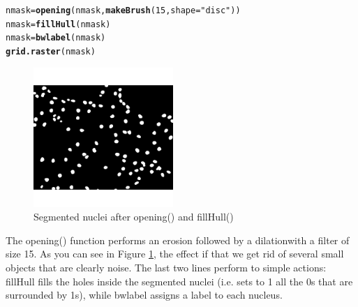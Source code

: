 \documentclass{article}\usepackage[]{graphicx}\usepackage[]{color}
\makeatletter
\newcommand{\hlnum}[1]{\textcolor[rgb]{0.686,0.059,0.569}{#1}}%
\newcommand{\hlstr}[1]{\textcolor[rgb]{0.192,0.494,0.8}{#1}}%
\newcommand{\hlstd}[1]{\textcolor[rgb]{0.345,0.345,0.345}{#1}}%
\newcommand{\hlkwb}[1]{\textcolor[rgb]{0.69,0.353,0.396}{#1}}%
\newcommand{\hlkwc}[1]{\textcolor[rgb]{0.333,0.667,0.333}{#1}}%
\newcommand{\hlkwd}[1]{\textcolor[rgb]{0.737,0.353,0.396}{\textbf{#1}}}%
\newenvironment{kframe}{%
 \def\at@end@of@kframe{}%
 \ifinner\ifhmode%
  \def\at@end@of@kframe{\end{minipage}}%
  \begin{minipage}{\columnwidth}%
 \fi\fi%
 \def\FrameCommand##1{\hskip\@totalleftmargin \hskip-\fboxsep
 \colorbox{shadecolor}{##1}\hskip-\fboxsep
     \hskip-\linewidth \hskip-\@totalleftmargin \hskip\columnwidth}%
 \MakeFramed {\advance\hsize-\width
   \@totalleftmargin\z@ \linewidth\hsize
   \@setminipage}}%
 {\par\unskip\endMakeFramed%
 \at@end@of@kframe}
\newenvironment{knitrout}{}{} %
\makeatother
\begin{document}
\begin{knitrout}
\color{fgcolor}\begin{kframe}
\begin{alltt}
\hlstd{nmask} \hlkwb{=} \hlkwd{opening}\hlstd{(nmask,} \hlkwd{makeBrush}\hlstd{(}\hlnum{15}\hlstd{,} \hlkwc{shape}\hlstd{=}\hlstr{"disc"}\hlstd{))}
\hlstd{nmask} \hlkwb{=} \hlkwd{fillHull}\hlstd{(nmask)}
\hlstd{nmask} \hlkwb{=} \hlkwd{bwlabel}\hlstd{(nmask)}
\hlkwd{grid.raster}\hlstd{(nmask)}
\end{alltt}
\end{kframe}\begin{figure}

{\centering \includegraphics[width=200px]{knit_figure/figopening-1} 

}

\caption[Segmented nuclei after opening() and fillHull()]{Segmented nuclei after opening() and fillHull()\label{fig:opening}}
\end{figure}


\end{knitrout}
The opening() function performs an erosion followed by a dilation\footnotemark[1] with a filter of size 15. As you can see in Figure \ref{fig:opening}, the effect if that we get rid of several small objects that are clearly noise.
The last two lines perform to simple actions: fillHull fills the holes inside the segmented nuclei (i.e. sets to 1 all the 0s that are surrounded by 1s), while bwlabel assigns a label to each nucleus.

\end{document}

